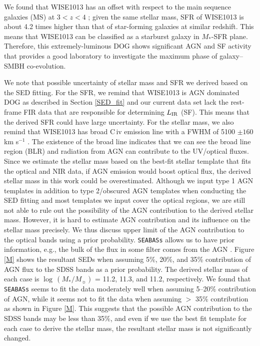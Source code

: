 \documentclass[twocolumn]{aastex6}
\begin{document}
We found that WISE1013 has an offset with respect to the main sequence galaxies (MS) at $3 < z < 4$ \citep{Tomczak}; given the same stellar mass, SFR of WISE1013 is about 4.2 times higher than that of star-forming galaxies at similar redshift.
This means that WISE1013 can be classified as a starburst galaxy in $M_*$-SFR plane.
Therefore, this extremely-luminous DOG shows significant AGN and SF activity that provides a good laboratory to investigate the maximum phase of galaxy--SMBH co-evolution.

We note that possible uncertainty of stellar mass and SFR we derived based on the SED fitting.
For the SFR, we remind that WISE1013 is AGN dominated DOG as described in Section \ref{SED_fit} and our current data set lack the rest-frame FIR data that are responsible for determining $L_{\rm IR}$ (SF).
This means that the derived SFR could have large uncertainty.
For the stellar mass, we also remind that WISE1013 has broad C{\,\sc iv} emission line with a FWHM of 5100 $\pm 160$ km s$^{-1}$ \citep[see bottom left panel of Figure 18 in][]{Hamann}.
The existence of the broad line indicates that we can see the broad line region (BLR) and radiation from AGN can contribute to the UV/optical fluxes.
Since we estimate the stellar mass based on the best-fit stellar template that fits the optical and NIR data, if AGN emission would boost optical flux, the derived stellar mass in this work could be overestimated.
Although we input type 1 AGN templates in addition to type 2/obscured AGN templates when conducting the SED fitting and most templates we input cover the optical regions, we are still not able to rule out the possibility of the AGN contribution to the derived stellar mass.
However, it is hard to estimate AGN contribution and its influence on the stellar mass precisely.
We thus discuss upper limit of the AGN contribution to the optical bands using a prior probability.
{\tt SEABASs} allows us to have prior information, e.g., the bulk of the flux in some filter comes from the AGN \citep[see][for more detail]{Rovilos}.
Figure \ref{M} shows the resultant SEDs when assuming 5\%, 20\%, and 35\% contribution of AGN flux to the SDSS bands as a prior probability.
The derived stellar mass of each case is $\log \,(M_{*}/M_{\sun})$ = 11.2, 11.3, and 11.2, respectively.
We found that {\tt SEABASs} seems to fit the data moderately well when assuming 5--20\% contribution of AGN, while it seems not to fit the data when assuming $>$ 35\% contribution as shown in Figure \ref{M}.
This suggests that the possible AGN contribution to the SDSS bands may be less than 35\%, and even if we use the best fit template for each case to derive the stellar mass, the resultant stellar mass is not significantly changed.
\end{document}
